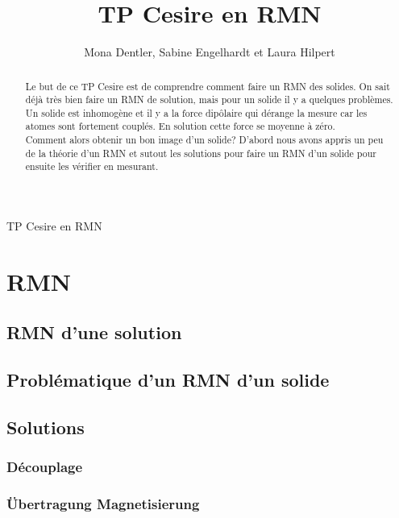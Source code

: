 \documentclass[a4paper,12pt]{scrartcl}
\title{TP Cesire \isotope[13]{C} en RMN}
\author{Mona Dentler, Sabine Engelhardt et Laura Hilpert}
\begin{document}
 \pagestyle{empty}
 \begin{center}
  \makeatletter
  \@subject
  \vspace{2cm}

  \Huge
  TP Cesire  en RMN\newline
  \vspace{1cm}
  \Large


  \@author
  \newline
  \@publishers


  \@date
  \makeatother
 \end{center}
 \vfill

 \begin{abstract}
  Le but de ce TP Cesire est de comprendre comment faire un RMN des solides. On sait déjà très bien faire un RMN de solution, mais pour un solide il y a quelques problèmes. Un solide est inhomogène et il y a la force dipôlaire qui dérange la mesure car les atomes sont fortement couplés. En solution cette force se moyenne à zéro.\\ 
  Comment alors obtenir un bon image d'un solide? D'abord nous avons appris un peu de la théorie d'un RMN et sutout les solutions pour faire un RMN d'un solide pour ensuite les vérifier en mesurant. 
 \end{abstract}
 \newpage
\pagestyle{scrheadings}
 \tableofcontents

 \section{RMN}
  \subsection{RMN d'une solution}

  \subsection{Problématique d'un RMN d'un solide}
   
  \subsection{Solutions}
   \subsubsection{Découplage}

   \subsubsection{Übertragung Magnetisierung}
\end{document}
